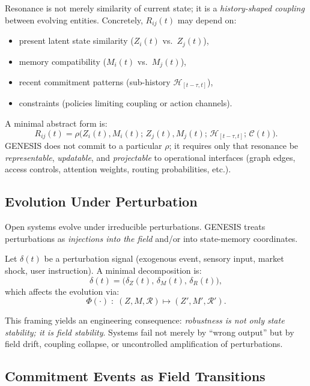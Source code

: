 \documentclass[11pt]{article}
\begin{document}
Resonance is not merely similarity of current state; it is a \emph{history-shaped coupling}
between evolving entities. Concretely, $R_{ij}(t)$ may depend on:
\begin{itemize}
  \item present latent state similarity ($Z_i(t)$ vs.\ $Z_j(t)$),
  \item memory compatibility ($M_i(t)$ vs.\ $M_j(t)$),
  \item recent commitment patterns (sub-history $\mathcal{H}_{[t-\tau,t]}$),
  \item constraints (policies limiting coupling or action channels).
\end{itemize}

A minimal abstract form is:
\[
R_{ij}(t) = \rho\big(Z_i(t), M_i(t);\, Z_j(t), M_j(t);\, \mathcal{H}_{[t-\tau,t]};\, \mathcal{C}(t)\big).
\]
GENESIS does not commit to a particular $\rho$; it requires only that resonance be
\emph{representable}, \emph{updatable}, and \emph{projectable} to operational interfaces
(graph edges, access controls, attention weights, routing probabilities, etc.).

\vspace{0.5em}
\subsection{Evolution Under Perturbation}

Open systems evolve under irreducible perturbations. GENESIS treats perturbations as
\emph{injections into the field} and/or into state-memory coordinates.

Let $\delta(t)$ be a perturbation signal (exogenous event, sensory input, market shock,
user instruction). A minimal decomposition is:
\[
\delta(t) = \big(\delta_Z(t),\, \delta_M(t),\, \delta_R(t)\big),
\]
which affects the evolution via:
\[
\Phi(\cdot) \;:\; (Z,M,\mathcal{R}) \mapsto (Z',M',\mathcal{R}').
\]

This framing yields an engineering consequence: \emph{robustness is not only state
stability; it is field stability}. Systems fail not merely by ``wrong output'' but by
field drift, coupling collapse, or uncontrolled amplification of perturbations.

\vspace{0.5em}
\subsection{Commitment Events as Field Transitions}
\end{document}
